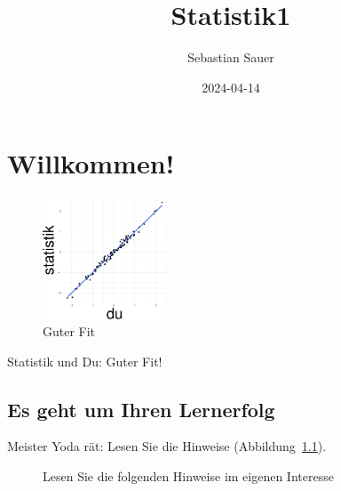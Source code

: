 \documentclass[
  a4paper,
  DIV=11]{scrreprt}
\title{Statistik1}
\author{Sebastian Sauer}
\date{2024-04-14}
\renewcommand*\contentsname{Inhaltsverzeichnis}
\newcommand\contentsname{Inhaltsverzeichnis}
\begin{document}
\maketitle

\renewcommand*\contentsname{Inhaltsverzeichnis}
{
\hypersetup{linkcolor=}
\setcounter{tocdepth}{2}
\tableofcontents
}
\chapter{Willkommen!}\label{willkommen}

\begin{figure}[H]

{\centering \includegraphics[width=0.33\textwidth,height=\textheight]{index_files/figure-pdf/unnamed-chunk-1-1.pdf}

}

\caption{Guter Fit}

\end{figure}%

Statistik und Du: Guter Fit!

\section{Es geht um Ihren Lernerfolg}\label{es-geht-um-ihren-lernerfolg}

Meister Yoda rät: Lesen Sie die Hinweise (Abbildung~\ref{fig-yoda}).

\begin{figure}


\caption{\label{fig-yoda}Lesen Sie die folgenden Hinweise im eigenen
Interesse}

\end{figure}%
\end{document}
